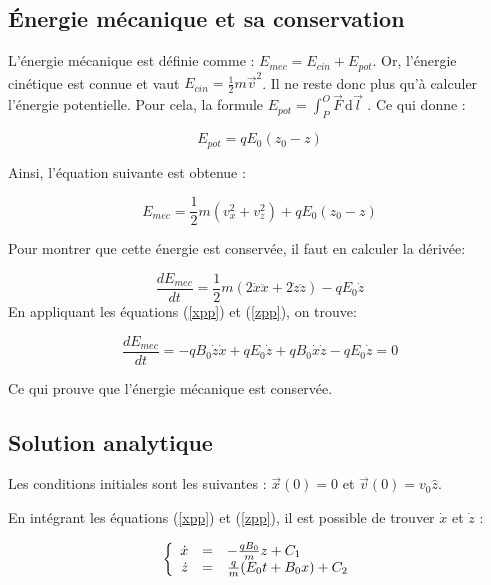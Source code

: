\documentclass[a4paper,12pt,twoside]{article}
\begin{document}
	\subsection{\'Energie m\'ecanique et sa conservation}
	
		L'\'energie m\'ecanique est d\'efinie comme : $E_{mec} = E_{cin} + E_{pot}$. Or, l'\'energie cin\'etique est connue et vaut $E_{cin} = \frac{1}{2} m {\vec{v}}^2$.
		Il ne reste donc plus qu'\`a calculer l'\'energie potentielle. Pour cela, la formule $E_{pot} = \int_P^O \vec{F}\, \mathrm d\vec{l}$ \cite{FT}. Ce qui donne :
	
			\begin{equation}
				E_{pot} = qE_0 (z_0-z)
			\end{equation}
		
		Ainsi, l'\'equation suivante est obtenue :
	
			\begin{equation}
				E_{mec} = \frac{1}{2}m(v_x^2+v_z^2) + qE_0(z_0 - z)
			\end{equation}
		
		Pour montrer que cette \'energie est conserv\'ee, il faut en calculer la d\'eriv\'ee:
	
			\begin{equation}
				\frac{dE_{mec}}{dt} = \frac{1}{2} m(2\dot{x}\ddot{x} + 2\dot{z}\ddot{z}) - 	qE_0\dot{z} 
			\end{equation}
		En appliquant les équations (\ref{xpp}) et (\ref{zpp}), on trouve:
	
			\begin{equation}
				\frac{dE_{mec}}{dt}= -qB_0\dot{z}\dot{x}+qE_0\dot{z}+qB_0\dot{x}\dot{z}-qE_0\dot{z} = 0
			\end{equation}
	
		Ce qui prouve que l'\'energie m\'ecanique est conserv\'ee.
	
	\subsection{Solution analytique}
	
		Les conditions initiales sont les suivantes : $\vec{x}(0) = 0$ et $ \vec{v}(0) = v_0\hat{z}$.
		
		En int\'egrant les \'equations (\ref{xpp}) et (\ref{zpp}), il est possible de trouver $\dot{x}$ et $\dot{z}$ :
		
			\begin{equation}\label{aa}
				\left \{
				\begin{array}{r c l}
					\dot{x} & = & -\frac{qB_0}{m}z + C_1  \\
					\dot{z} & = & \frac{q}{m} (E_0t + B_0x) + C_2\\
				\end{array}
				\right .
			\end{equation}
		
\end{document}
